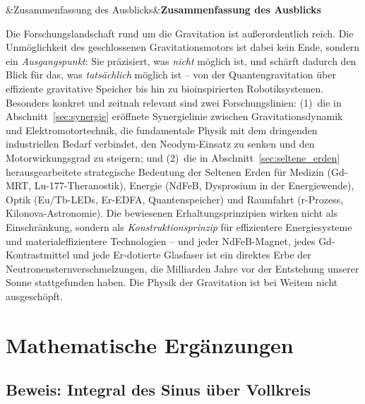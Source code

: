 ﻿\documentclass[12pt, a4paper]{report}
\newenvironment{hinweis}[1][]{%
  \begin{hinweisframe}\sloppy%
  \ifx&#1&\else\textbf{#1}\par\smallskip\fi}{\end{hinweisframe}}
\theoremstyle{definition}
\theoremstyle{remark}
\begin{document}
\begin{hinweis}[Zusammenfassung des Ausblicks]
  Die Forschungslandschaft rund um die Gravitation ist außerordentlich reich.
  Die Unmöglichkeit des geschlossenen Gravitationsmotors ist dabei kein Ende,
  sondern ein \emph{Ausgangspunkt}: Sie präzisiert, was \emph{nicht} möglich ist,
  und schärft dadurch den Blick für das, was \emph{tatsächlich} möglich ist --
  von der Quantengravitation über effiziente gravitative Speicher bis hin zu
  bioinspirierten Robotiksystemen. Besonders konkret und zeitnah relevant sind
  zwei Forschungslinien: (1)~die in Abschnitt~\ref{sec:synergie} eröffnete
  Synergielinie zwischen Gravitationsdynamik und Elektromotortechnik, die
  fundamentale Physik mit dem dringenden industriellen Bedarf verbindet,
  den Neodym-Einsatz zu senken und den Motorwirkungsgrad zu steigern; und
  (2)~die in Abschnitt~\ref{sec:seltene_erden} herausgearbeitete strategische
  Bedeutung der Seltenen Erden für Medizin (Gd-MRT, Lu-177-Theranostik),
  Energie (NdFeB, Dysprosium in der Energiewende), Optik (Eu/Tb-LEDs,
  Er-EDFA, Quantenspeicher) und Raumfahrt (r-Prozess, Kilonova-Astronomie).
  Die bewiesenen Erhaltungsprinzipien wirken nicht als Einschränkung, sondern
  als \emph{Konstruktionsprinzip} für effizientere Energiesysteme und
  materialeffizientere Technologien -- und jeder NdFeB-Magnet, jedes
  Gd-Kontrastmittel und jede Er-dotierte Glasfaser ist ein direktes Erbe
  der Neutronensternverschmelzungen, die Milliarden Jahre vor der Entstehung
  unserer Sonne stattgefunden haben.
  Die Physik der Gravitation ist bei Weitem nicht ausgeschöpft.
\end{hinweis}

\appendix
\chapter{Mathematische Ergänzungen}
\label{app:math}

\section{Beweis: Integral des Sinus über Vollkreis}
\end{document}
